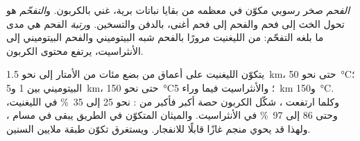 \begin{definition}\label{def:g11:fossil-fuel-geology:coal}
\emph{الفحم} صخر رسوبي مكوّن في معظمه من بقايا
نباتات برية، غني بالكربون. و\emph{التفحّم} هو
تحول الخث إلى فحم والفحم إلى فحم أغنى، بالدفن
والتسخين. و\emph{رتبة} الفحم هي مدى ما
بلغه التفحّم: من الليغنيت مرورًا بالفحم شبه البيتوميني والفحم البيتوميني
إلى الأنثراسيت، يرتفع محتوى الكربون.
\end{definition}

يتكوّن الليغنيت على أعماق من بضع مئات من الأمتار إلى نحو \qty{1.5}{km}،
حتى نحو \qty{50}{\degreeCelsius}؛  البيتوميني بين 1
و\qty{5}{km}، حتى نحو \qty{150}{\degreeCelsius}؛ والأنثراسيت فيما وراء
\qty{5}{km} و\qty{150}{\degreeCelsius}. وكلما ارتفعت ، شكّل الكربون
حصة أكبر فأكبر من : نحو
25 إلى \qty{35}{\percent} في الليغنيت، وحتى 86 إلى \qty{97}{\percent} في
الأنثراسيت. والميثان المتكوّن في الطريق يبقى في مسام ، ولهذا
قد يحوي منجم  غازًا قابلًا للانفجار. ويستغرق تكوّن طبقة  ملايين
السنين.

